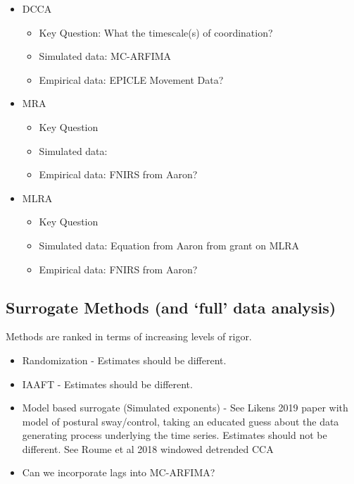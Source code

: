 \documentclass[
  english,
  man]{apa6}
\providecommand{\tightlist}{%
  \setlength{\itemsep}{0pt}\setlength{\parskip}{0pt}}
\begin{document}
\begin{itemize}
\item
  DCCA

  \begin{itemize}
  \tightlist
  \item
    Key Question: What the timescale(s) of coordination?
  \item
    Simulated data: MC-ARFIMA
  \item
    Empirical data: EPICLE Movement Data?
  \end{itemize}
\item
  MRA

  \begin{itemize}
  \tightlist
  \item
    Key Question
  \item
    Simulated data:
  \item
    Empirical data: FNIRS from Aaron?
  \end{itemize}
\item
  MLRA

  \begin{itemize}
  \tightlist
  \item
    Key Question
  \item
    Simulated data: Equation from Aaron from grant on MLRA
  \item
    Empirical data: FNIRS from Aaron?
  \end{itemize}
\end{itemize}

\hypertarget{surrogate-methods-and-full-data-analysis}{%
\subsection{Surrogate Methods (and `full' data analysis)}\label{surrogate-methods-and-full-data-analysis}}

Methods are ranked in terms of increasing levels of rigor.

\begin{itemize}
\tightlist
\item
  Randomization - Estimates should be different.
\item
  IAAFT - Estimates should be different.
\item
  Model based surrogate (Simulated exponents) - See Likens 2019 paper
  with model of postural sway/control, taking an educated guess about
  the data generating process underlying the time series. Estimates
  should not be different. See Roume et al 2018 windowed detrended CCA
\item
  Can we incorporate lags into MC-ARFIMA?
\end{itemize}
\end{document}
